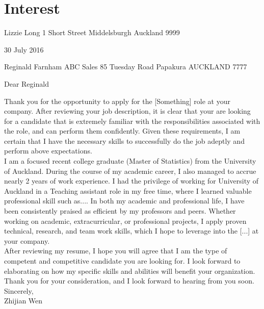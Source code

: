 \documentclass[11pt,a4paper, twoside]{moderncv} %
\begin{document}
\section{Interest}







\clearpage

Lizzie Long
1 Short Street
Middelsburgh
Auckland 9999

30 July 2016

Reginald Farnham
ABC Sales
85 Tuesday Road
Papakura
AUCKLAND 7777

Dear Reginald


Thank you for the opportunity to apply for the [Something] role at your company. After reviewing your job description, it is clear that your are looking for a candidate that is extremely familiar with the responsibilities associated with the role, and can perform them confidently. Given these requirements, I am certain that I have the necessary skills to successfully do the job adeptly and perform above expectations.\\

I am a focused recent college graduate (Master of Statistics) from the University of Auckland. During the course of my academic career, I also managed to accrue nearly 2 years of work experience. I had the privilege of working for University of Auckland in a Teaching assistant role in my free time, where I learned valuable professional skill such as.... In both my academic and professional life, I have been consistently praised as efficient by my professors and peers. Whether working on academic, extracurricular, or professional projects, I apply proven technical, research, and team work skills, which I hope to leverage into the [...] at your company. \\

After reviewing my resume, I hope you will agree that I am the type of competent and competitive candidate you are looking for. I look forward to elaborating on how my specific skills and abilities will benefit your organization. \\

Thank you for your consideration, and I look forward to hearing from you soon. \\

Sincerely, \\

Zhijian Wen\\


\end{document}
